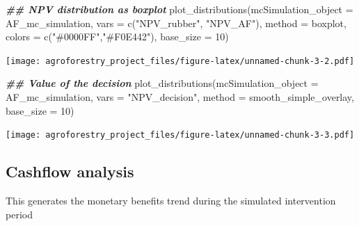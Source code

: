 \documentclass[
]{article}
\newenvironment{Shaded}{\begin{snugshade}}{\end{snugshade}}
\newcommand{\AttributeTok}[1]{\textcolor[rgb]{0.77,0.63,0.00}{#1}}
\newcommand{\DecValTok}[1]{\textcolor[rgb]{0.00,0.00,0.81}{#1}}
\newcommand{\DocumentationTok}[1]{\textcolor[rgb]{0.56,0.35,0.01}{\textbf{\textit{#1}}}}
\newcommand{\FunctionTok}[1]{\textcolor[rgb]{0.00,0.00,0.00}{#1}}
\newcommand{\NormalTok}[1]{#1}
\newcommand{\StringTok}[1]{\textcolor[rgb]{0.31,0.60,0.02}{#1}}
\begin{document}
\begin{Shaded}
\begin{Highlighting}[]
\DocumentationTok{\#\# NPV distribution as boxplot}
\FunctionTok{plot\_distributions}\NormalTok{(}\AttributeTok{mcSimulation\_object =}\NormalTok{ AF\_mc\_simulation,}
                  \AttributeTok{vars =} \FunctionTok{c}\NormalTok{(}\StringTok{"NPV\_rubber"}\NormalTok{, }\StringTok{"NPV\_AF"}\NormalTok{),}
                  \AttributeTok{method =} \StringTok{\textquotesingle{}boxplot\textquotesingle{}}\NormalTok{,}
                  \AttributeTok{colors =} \FunctionTok{c}\NormalTok{(}\StringTok{"\#0000FF"}\NormalTok{,}\StringTok{"\#F0E442"}\NormalTok{),}
                  \AttributeTok{base\_size =} \DecValTok{10}\NormalTok{)}
\end{Highlighting}
\end{Shaded}

\texttt{[image: agroforestry\_project\_files/figure-latex/unnamed-chunk-3-2.pdf]}

\begin{Shaded}
\begin{Highlighting}[]
\DocumentationTok{\#\# Value of the decision }
\FunctionTok{plot\_distributions}\NormalTok{(}\AttributeTok{mcSimulation\_object =}\NormalTok{ AF\_mc\_simulation,}
                  \AttributeTok{vars =} \StringTok{"NPV\_decision"}\NormalTok{,}
                  \AttributeTok{method =} \StringTok{\textquotesingle{}smooth\_simple\_overlay\textquotesingle{}}\NormalTok{,}
                  \AttributeTok{base\_size =} \DecValTok{10}\NormalTok{)}
\end{Highlighting}
\end{Shaded}

\texttt{[image: agroforestry\_project\_files/figure-latex/unnamed-chunk-3-3.pdf]}

\hypertarget{cashflow-analysis}{%
\subsection{\texorpdfstring{\textbf{Cashflow analysis}}{Cashflow analysis}}\label{cashflow-analysis}}

This generates the monetary benefits trend during the simulated intervention period
\end{document}
